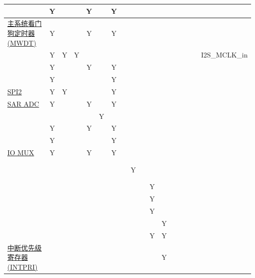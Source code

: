 \documentclass[main\_\_CN.tex]{subfiles}
\begin{document}
\begin{landscape}
\begin{tiny}
\begin{longtable}[c]{|m{3cm}|c|c|c|c|c|c|C{1.4cm}|c|c|c|c|c|c|c|c|c| }
     & Y &  &  & Y &  & Y &  &  &  &  &  &  &  &  &  &    \\ \hline
    \hyperref[mod:wdt]{主系统看门狗定时器 (MWDT)} & Y &  &  & Y &  & Y &  &  &  &  &  &  &  &  &  &    \\ \hline
     & Y & Y & Y &  &  &  &  &  &  &  &    &  &  &  &  & I2S\_MCLK\_in \\ \hline
     & Y &   &  & Y &  & Y &  &  &  &  &    &  &  &  &  &  \\ \hline
     & Y &  &  &  &  & Y &  &  &  &  &  &  &  &  &  &  \\ \hline
    \hyperref[mod:spi]{SPI2} & Y  & Y &  &  &  & Y &  &  &  &  &  &  &  &  &  &  \\ \hline
    \hyperref[mod:adc]{SAR ADC}  & Y  &  &  & Y &  & Y &  &  &  &  &  &  &  &  &  &  \\ \hline
     &   &  &  &  & Y &  &  &  &  &  &  &  &  &  &  &  \\ \hline
     & Y &  &  & Y &  & Y &  &  &  &  &  &  &  &  &  &  \\ \hline
     & Y &  &  &  &  & Y &  &  &  &  &  &  &  &  &  &  \\ \hline
    \hyperref[mod:iomuxgpio]{IO MUX} & Y  &  &  & Y &  & Y &  &  &  &  &  &  &  &  &  &  \\ \hline
     &   &  &  &  &  &  &  &  Y &  &  &  &  &  &  &  &  \\ \hline
     &   &  &  &  &  &  &  &  &  &  Y &  &  &  &  &  &  \\ \hline
     &   &  &  &  &  &  &  &  &  &  Y &  &  &  &  &  &  \\ \hline
     &   &  &  &  &  &  &  &  &  &  Y &  &  &  &  &  &  \\ \hline
     &   &  &  &  &  &  &  &  &  &  &  Y &  &  &  &  &  \\ \hline
      &  &  &  &  &  &  &  &  &  & Y & Y &  &  &  &  &  \\ \hline
    \hyperref[mod:riscvcpu]{中断优先级寄存器 (INTPRI)} &   &  &  &  &  &  &  &  &  &  & Y &  &  &  &  &  \\ \hline
\end{longtable}



\end{tiny}
\end{landscape}
\end{document}
